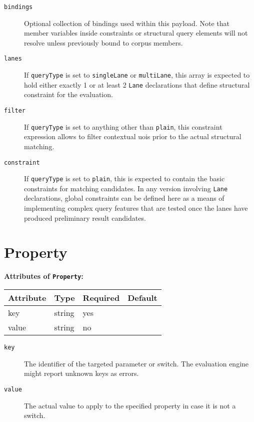 \documentclass[11pt,a4paper]{report}
\newcommand{\iqlType}[1]{\texttt{\iqlns#1}}
\newenvironment{attributes}[1]{
	\noindent\textbf{Attributes of #1:}\newline\medskip
	\begin{tabular}{|p{0.3\textwidth}|p{0.20\textwidth}|p{0.20\textwidth}|p{0.17\textwidth}|}
		\hline
		\textbf{Attribute} & \textbf{Type} & \textbf{Required} & \textbf{Default} \\ 
		\hline
		\hline
	}{
	\end{tabular}
}
\newcommand{\attribute}[4]{
	#1 & #2 & #3 & #4 \\
	\hline
}
\begin{document}
\begin{description}
	\item[\iqlType{bindings}] Optional collection of bindings used within this payload. Note that member variables inside constraints or structural query elements will not resolve unless previously bound to corpus members.
	\item[\iqlType{lanes}] If \iqlType{queryType} is set to \texttt{singleLane} or \texttt{multiLane}, this array is expected to hold either exactly 1 or at least 2 \iqlType{Lane} declarations that define structural constraint for the evaluation.
	\item[\iqlType{filter}] If \iqlType{queryType} is set to anything other than \texttt{plain}, this constraint expression allows to filter contextual \acp{uoi} prior to the actual structural matching.
	\item[\iqlType{constraint}] If \iqlType{queryType} is set to \texttt{plain}, this is expected to contain the basic constraints for matching candidates. In any version involving \iqlType{Lane} declarations, global constraints can be defined here as a means of implementing complex query features that are tested once the lanes have produced preliminary result candidates.
\end{description}

\section{Property}
\label{sec:json-ld-property}
\begin{attributes}{\iqlType{Property}}
	\attribute{key}{string}{yes}{}
	\attribute{value}{string}{no}{}
\end{attributes}
\begin{description}
	\item[\iqlType{key}] The identifier of the targeted parameter or switch. The evaluation engine might report unknown keys as errors.
	\item[\iqlType{value}] The actual value to apply to the specified property in case it is not a switch.
\end{description}
\end{document}
